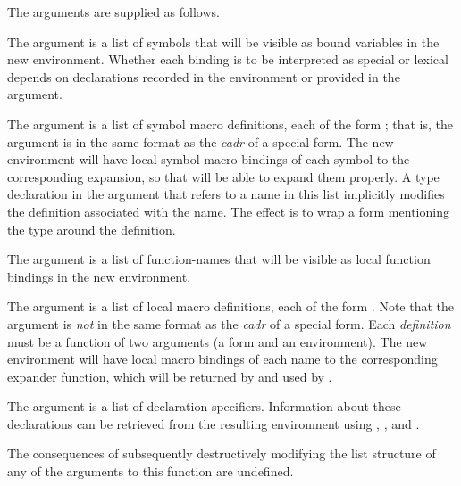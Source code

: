 \begin{newer}
\begin{defun}[Function]
  The arguments are supplied as follows.
\begin{flushdesc}
\item[\cd{:variable}]
     The argument is a list of symbols that will be visible as bound variables in
                the new environment.  Whether each binding is to be interpreted
                as special or lexical depends on  declarations recorded
                in the environment or provided in the  argument.

\item[\cd{:symbol-macro}]
 The argument is a list of symbol macro definitions, each of the form
                ; that is, the argument is
                in the same format as the
                {\it cadr} of a  special form.  The new environment
                will have local symbol-macro bindings of each symbol to the
                corresponding expansion, so that  will be able to
                expand them properly.  A type declaration in the 
                argument that refers to a name in this list implicitly
                modifies the definition associated with the name.  The effect
                is to wrap a  form mentioning the type around the
                definition.

\item[\cd{:function}]
     The argument is a list of function-names that will be visible as local
                function bindings in the new environment.

\item[\cd{:macro}]
        The argument is a list of local macro definitions, 
        each of the form .
        Note that the argument is {\it not}
                in the same format as the
                {\it cadr} of a  special form.
                Each {\it definition} must be a function of two
                arguments (a form and an environment).  The new environment
                will have local macro bindings of each name to the
                corresponding expander function, which will be returned by
                 and used by .

\item[\cd{:declare}]
      The argument is a list of declaration specifiers.
      Information about these declarations can
                be retrieved from the resulting environment using
                , , and
                .
\end{flushdesc}
  The consequences of subsequently
  destructively modifying the list
  structure of any of the arguments to this function are undefined.


\end{defun}
\end{newer}
